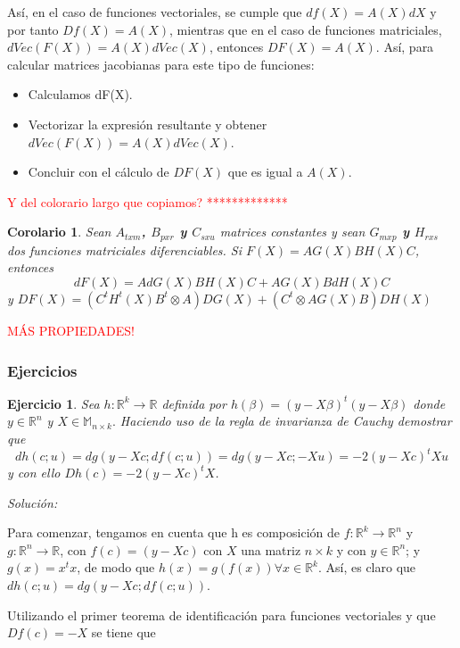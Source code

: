 \documentclass{article}
\theoremstyle{theorem-style}  %
\newtheorem{corollary}[theorem]{Corolario} %
\theoremstyle{definition-style}
\theoremstyle{example-style}
\theoremstyle{exercise-style}
\newtheorem{exercise}{Ejercicio}[section]
\begin{document}
	Así, en el caso de funciones vectoriales, se cumple que $df(X)=A(X)dX$ y por tanto $Df(X)=A(X)$, mientras que en el caso de funciones matriciales, $dVec(F(X))=A(X)dVec(X)$, entonces $DF(X)=A(X)$. Así, para calcular matrices jacobianas para este tipo de funciones:
	
	\begin{itemize}
		\item Calculamos dF(X).
		\item Vectorizar la expresión resultante y obtener $dVec(F(X))=A(X)dVec(X)$.
		\item Concluir con el cálculo de $DF(X)$ que es igual a $A(X)$.
	\end{itemize}
	
	\textcolor{red}{Y del colorario largo que copiamos? *************}
	
	\begin{corollary}
		Sean \textbf{$A_{txm}$, $B_{pxr}$ y $C_{sxu}$} matrices constantes y sean \textbf{$G_{mxp}$ y $H_{rxs}$} dos funciones matriciales diferenciables. Si \textbf{$F(X) = AG(X)BH(X)C$}, entonces
		\textbf{$$ dF(X)= AdG(X)BH(X)C + AG(X)BdH(X)C $$}
		y \textbf{$DF(X)= (C^tH^t(X)B^t \otimes A)DG(X) + (C^t \otimes AG(X)B)DH(X)$} 
	\end{corollary}
	
	\textcolor{red}{MÁS PROPIEDADES!}
	
	\subsubsection{Ejercicios}
	
	\begin{exercise}
		Sea $h: \mathbb{R}^k \rightarrow \mathbb{R}$ definida por $h(\beta) = (y-X\beta)^t(y-X\beta)$ donde $y \in \mathbb{R}^n$ y $X\in\mathbb{M}_{n\times k}.$ Haciendo uso de la regla de invarianza de Cauchy demostrar que
		$$dh(c;u) = dg(y-Xc;df(c;u)) = dg(y-Xc;-Xu)=-2(y-Xc)^tXu$$
		y con ello $Dh(c)=-2(y-Xc)^tX$.
	\end{exercise}
	\textit{Solución: }
	
	
	Para comenzar, tengamos en cuenta que h es composición de $f: \mathbb{R}^k \rightarrow \mathbb{R}^n$ y $g:\mathbb{R}^n \rightarrow \mathbb{R}$, con $f(c) = (y-Xc)$ con $X$ una matriz $n \times k$ y con $y \in \mathbb{R}^n$; y $g(x) = x^tx$, de modo que $h(x)=g(f(x)) \forall x \in  \mathbb{R}^k$. Así, es claro que  $dh(c;u) = dg(y-Xc;df(c;u))$.
	
	
	Utilizando el primer teorema de identificación para funciones vectoriales y que $Df(c) = -X$ se tiene que
	
\end{document}
